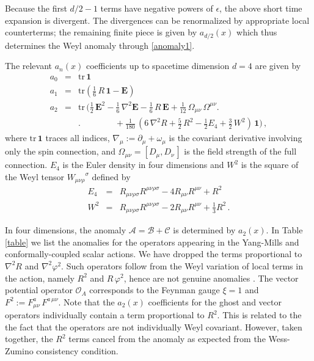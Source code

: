 \documentclass[12pt,a4paper]{article}
\newcommand{\bea}{\begin{eqnarray}}
\newcommand{\eea}{\end{eqnarray}}
\newcommand{\cA}{\mathcal{A}}
\newcommand{\cB}{\mathcal{B}}
\newcommand{\cC}{\mathcal{C}}
\newcommand{\cO}{\mathcal{O}}
\newcommand{\e}{\epsilon}
\newcommand{\m}{\mu}
\newcommand{\n}{\nu}
\renewcommand{\r}{\rho}
\newcommand{\s}{\sigma}
\renewcommand{\O}{\Omega}
\newcommand{\1}{{\textbf{1}}}
\newcommand{\half}{\frac{1}{2}}
\newcommand{\nn}{\nonumber}
\newcommand{\+}{{\,+ \,}}
\begin{document}
Because the first $d/2-1$ terms have negative powers of $\e$, the above short time expansion  is divergent. The divergences can be renormalized by appropriate local counterterms;  the remaining finite  piece is given by $a_{d/2}(x)$ which thus determines the Weyl anomaly through \eqref{anomaly1}. 


The relevant $a_n(x)$ coefficients  up to spacetime dimension $d=4$ are given by \cite{Vassilevich:2003xt}
\bea
a_0 &=& \text{tr}\, \mathbf{1}\\
a_1 &=&  \text{tr}\left(\frac{1}{6}\,R\, \textbf{1}-\textbf{E}\right)\\
a_2 &=&\text{tr}\, \bigg( \half\,\textbf{E}^2- \frac{1}{6}\,\nabla^2 \textbf{E}-\frac{1}{6}\,R\,\textbf{E}+\frac{1}{12}\,\O_{\m\n}\,\O^{\m\n}\bigg. \nn\\
 & &\bigg.\qquad\qquad+\frac{1}{180}\,\left(6\,\nabla^2 R+\frac{5}{2}\,R^2 -\half E_4 +\frac{3}{2}\,W^{2}\right)\,\textbf{1}\bigg)\, ,
\eea
where $\text{tr}\, \textbf{1}$ traces all indices, $\nabla_\m := \partial_{\m}+ \omega_{\mu}$ is the covariant derivative involving only the spin connection, and $\O_{\m\n}=[D_\m,D_{\n\,}]$ is the field strength of the full connection. $E_{4}$ is the Euler density in four dimensions and $W^{2}$ is the square of the Weyl tensor ${W_{\m\n\r}}^\s$ defined by
\bea
E_{4} &=& R_{\m\n\r\s}R^{\m\n\r\s} -4 R_{\m\n}R^{\m\n} + R^{2} \\
W^{2} &=& R_{\m\n\r\s}R^{\m\n\r\s} -2 R_{\m\n}R^{\m\n} + \frac{1}{3} R^{2}\, .
\eea

In four dimensions, the anomaly $\cA = \cB + \cC$ is determined by $a_2(x)$.  In Table \ref{table} we list the anomalies for the operators appearing in the Yang-Mills and conformally-coupled scalar actions. 
We have dropped the terms proportional to  $\nabla^2 R$ and $ \nabla^2\varphi^2$. Such operators follow from the Weyl variation of  local terms in the action, namely $R^2$ and $R\,\varphi^{2}$, hence are not genuine anomalies  \cite{Bonora:1983ff}. The vector potential operator $\cO_A$ corresponds to the Feynman gauge $\xi=1$ and $F^{2} := F^a_{\m\n}\,F^{a\,\m\n}$. Note that the $a_{2}(x)$ coefficients for the ghost and vector operators individually contain a term proportional to $R^{2}$. This is related to the the fact that the operators are not individually Weyl covariant. However, taken together, the $R^{2}$ terms cancel from the anomaly as expected from  the Wess-Zumino consistency condition.
\end{document}
